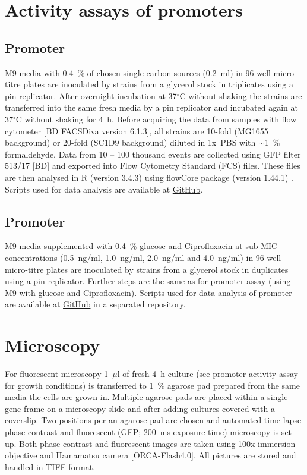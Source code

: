 \section{Activity assays of promoters}
\subsection{Promoter }
M9 media with 0.4~\% of chosen single carbon sources (0.2~ml) in 96-well micro-titre plates are inoculated by strains from a glycerol stock in triplicates using a pin replicator.
After overnight incubation at 37$^{\circ}$C without shaking the strains are transferred into the same fresh media by a pin replicator and incubated again at 37$^{\circ}$C without shaking for 4~h.
Before acquiring the data from samples with flow cytometer [BD FACSDiva version 6.1.3], all strains are 10-fold (MG1655 background) or 20-fold (SC1\textunderscore D9 background) diluted in 1x~PBS with $\sim$1~\% formaldehyde.
Data from 10 -- 100 thousand events are collected using GFP filter 513/17 [BD] and exported into Flow Cytometry Standard (FCS) files.
These files are then analysed in R (version 3.4.3) using flowCore package (version 1.44.1) \cite{hahne2009flowcore}.
Scripts used for data analysis are available at \href{https://github.com/marketavlkova/LacZ_FC}{GitHub}.

\subsection{Promoter }
M9 media supplemented with 0.4~\% glucose and Ciprofloxacin at sub-MIC concentrations (0.5~ng/ml, 1.0~ng/ml, 2.0~ng/ml and 4.0~ng/ml) in 96-well micro-titre plates are inoculated by strains from a glycerol stock in duplicates using a pin replicator.
Further steps are the same as for  promoter assay (using M9 with glucose and Ciprofloxacin).
Scripts used for data analysis of  promoter are available at \href{https://github.com/marketavlkova/RecA}{GitHub} in a separated repository.


\section{Microscopy}
For fluorescent microscopy 1~$\mu$l of fresh 4~h culture (see promoter activity assay for growth conditions) is transferred to 1~\% agarose pad prepared from the same media the cells are grown in.
Multiple agarose pads are placed within a single gene frame on a microscopy slide and after adding cultures covered with a coverslip.
Two positions per an agarose pad are chosen and automated time-lapse phase contrast and fluorescent (GFP; 200~ms exposure time) microscopy is set-up.
Both phase contrast and fluorescent images are taken using 100x immersion objective and Hamamatsu camera [ORCA-Flash4.0].
All pictures are stored and handled in TIFF format.

\shorthandon{-}
